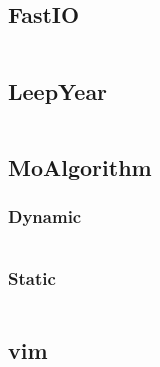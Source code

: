 \documentclass[a4paper,11pt]{article}
\begin{document}
\subsection{FastIO}
\inputminted[breaklines]{c++}{07++Others/+FastIO.cpp}
\subsection{LeepYear}
\inputminted[breaklines]{c++}{07++Others/+LeepYear.cpp}
\subsection{MoAlgorithm}
\subsubsection{Dynamic}
\inputminted[breaklines]{c++}{07++Others/+MoAlgorithm/+Dynamic.cpp}
\subsubsection{Static}
\inputminted[breaklines]{c++}{07++Others/+MoAlgorithm/+Static.cpp}

\subsection{vim}
\inputminted[breaklines]{c++}{07++Others/+vim.vim}

\newpage
\end{document}
